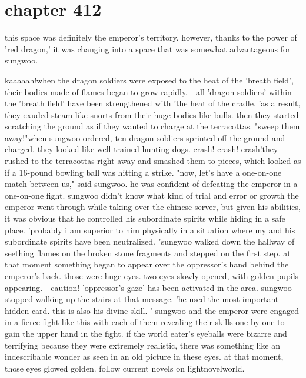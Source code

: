 \section{chapter 412}

this space was definitely the emperor's territory.
 however, thanks to the power of 'red dragon,' it was changing into a space that was somewhat advantageous for sungwoo.
 




kaaaaah!when the dragon soldiers were exposed to the heat of the 'breath field', their bodies made of flames began to grow rapidly.
- all 'dragon soldiers' within the 'breath field' have been strengthened with 'the heat of the cradle.
'as a result, they exuded steam-like snorts from their huge bodies like bulls.
then they started scratching the ground as if they wanted to charge at the terracottas.
"sweep them away!"when sungwoo ordered, ten dragon soldiers sprinted off the ground and charged.
 they looked like well-trained hunting dogs.
crash! crash! crash!they rushed to the terracottas right away and smashed them to pieces, which looked as if a 16-pound bowling ball was hitting a strike.
"now, let's have a one-on-one match between us," said sungwoo.
he was confident of defeating the emperor in a one-on-one fight.
sungwoo didn't know what kind of trial and error or growth the emperor went through while taking over the chinese server, but given his abilities, it was obvious that he controlled his subordinate spirits while hiding in a safe place.
'probably i am superior to him physically in a situation where my and his subordinate spirits have been neutralized.
"sungwoo walked down the hallway of seething flames on the broken stone fragments and stepped on the first step.
 at that moment something began to appear over the oppressor's hand behind the emperor's back.
 those were huge eyes.
 two eyes slowly opened, with golden pupils appearing.
- caution! 'oppressor's gaze' has been activated in the area.
sungwoo stopped walking up the stairs at that message.
'he used the most important hidden card.
 this is also his divine skill.
'
sungwoo and the emperor were engaged in a fierce fight like this with each of them revealing their skills one by one to gain the upper hand in the fight.
if the world eater's eyeballs were bizarre and terrifying because they were extremely realistic, there was something like an indescribable wonder as seen in an old picture in these eyes.
at that moment, those eyes glowed golden.
follow current novels on lightnov­elworld.
